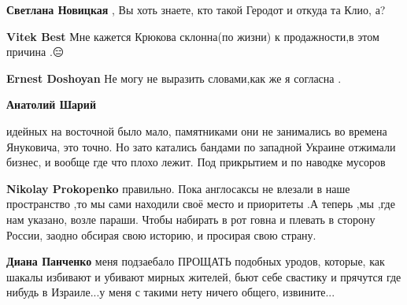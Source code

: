 \begin{itemize}
\begin{itemize}
\textbf{Светлана Новицкая} , Вы хоть знаете, кто такой Геродот и откуда та Клио, а?

 
\textbf{Vitek Best} Мне кажется Крюкова склонна(по жизни) к продажности,в этом причина .😑

 
\textbf{Ernest Doshoyan} Не могу не выразить словами,как же я согласна .

 
\textbf{Анатолий Шарий} 

идейных на восточной было мало, памятниками они не занимались во времена
Януковича, это точно. Но зато катались бандами по западной Украине отжимали
бизнес, и вообще где что плохо лежит. Под прикрытием и по наводке мусоров

 
\textbf{Nikolay Prokopenko} правильно. Пока англосаксы не влезали в наше
пространство ,то мы сами находили своё место и приоритеты .А теперь ,мы ,где
нам указано, возле параши. Чтобы набирать в рот говна и плевать в сторону
России, заодно обсирая свою историю, и просирая свою страну.

 
\textbf{Диана Панченко} меня подзаебало ПРОЩАТЬ подобных уродов, которые, как
шакалы избивают и убивают мирных жителей, бьют себе свастику и прячутся где
нибудь в Израиле...у меня с такими нету ничего общего, извините...


\end{itemize}
\end{itemize}
